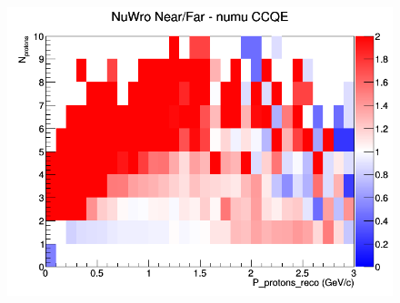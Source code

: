 \begin{figure}[h]
\endminipage
{}
\includegraphics[width=\linewidth]{eff_N_P/GAr/protons/ratios/CCQE_NuWro_numu_NF_N_P.png}
\endminipage
\newline
\end{figure}
\clearpage
